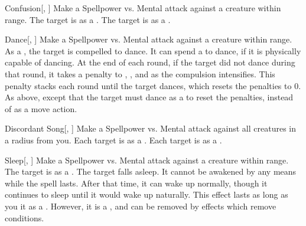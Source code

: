 \begin{ability}[\nth{2}]{Confusion}[, ]
Make a Spellpower vs. Mental attack against a creature within \rngmed range.
\hit The target is \disoriented as a .
\crit The target is \confused as a .
\end{ability}
\vspace{0.25em}


\begin{ability}[\nth{3}]{Dance}[, ]
Make a Spellpower vs. Mental attack against a creature within \rngmed range.
\hit As a , the target is compelled to dance.
It can spend a  to dance, if it is physically capable of dancing.
At the end of each round, if the target did not dance during that round, it takes a  penalty to , , and  as the compulsion intensifies.
This penalty stacks each round until the target dances, which resets the penalties to 0.
\crit As above, except that the target must dance as a  to reset the penalties, instead of as a move action.
\end{ability}
\vspace{0.25em}


\begin{ability}[\nth{4}]{Discordant Song}[, ]
Make a Spellpower vs. Mental attack against all creatures in a \areamed radius from you.
\hit Each target is \disoriented as a .
\crit Each target is \confused as a .
\end{ability}
\vspace{0.25em}


\begin{ability}[\nth{4}]{Sleep}[, ]
Make a Spellpower vs. Mental attack against a creature within \rngmed range.
\hit The target is \blinded as a .
\crit The target falls asleep.
It cannot be awakened by any means while the spell lasts.
After that time, it can wake up normally, though it continues to sleep until it would wake up naturally.
This effect lasts as long as you  it as a .
However, it is a , and can be removed by effects which remove conditions.
\end{ability}
\vspace{0.25em}


